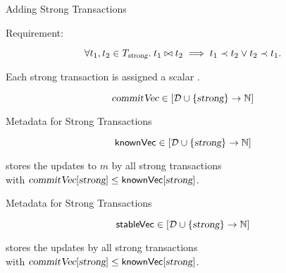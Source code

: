 
\begin{frame}{Adding Strong Transactions}
  \begin{center}
  \end{center}
\end{frame}

\begin{frame}{Requirement: \conflictaxiom}
  \begin{center}
    \[
      \forall t_{1}, t_{2} \in T_{\textsl{strong}}.\;
      t_{1} \bowtie t_{2} \implies t_{1} \prec t_{2} \lor t_{2} \prec t_{1}.
    \]

    Each strong transaction is assigned a scalar .

    \[
      \textsl{commitVec} \in [\mathcal{D} \cup \{\textsl{strong}\} \to \mathbb{N}]
    \]
  \end{center}
\end{frame}

\begin{frame}{Metadata for Strong Transactions}
  \begin{center}
    \[
      {\sf knownVec} \in [\mathcal{D} \cup \{\textsl{strong}\} \to \mathbb{N}]
    \]

    \begin{property}
      \begin{center}
         stores the updates to $m$ by all strong transactions \\[3pt]
        with $\textsl{commitVec}[\textsl{strong}] \le {\sf knownVec}[\textsl{strong}]$.
      \end{center}
    \end{property}
  \end{center}
\end{frame}

\begin{frame}{Metadata for Strong Transactions}
  \begin{center}
    \[
      {\sf stableVec} \in [\mathcal{D} \cup \{\textsl{strong}\} \to \mathbb{N}]
    \]


    \begin{property}
      \begin{center}
         stores the updates by all strong transactions \\[3pt]
        with $\textsl{commitVec}[\textsl{strong}] \le {\sf knownVec}[\textsl{strong}]$.
      \end{center}
    \end{property}
  \end{center}
\end{frame}

